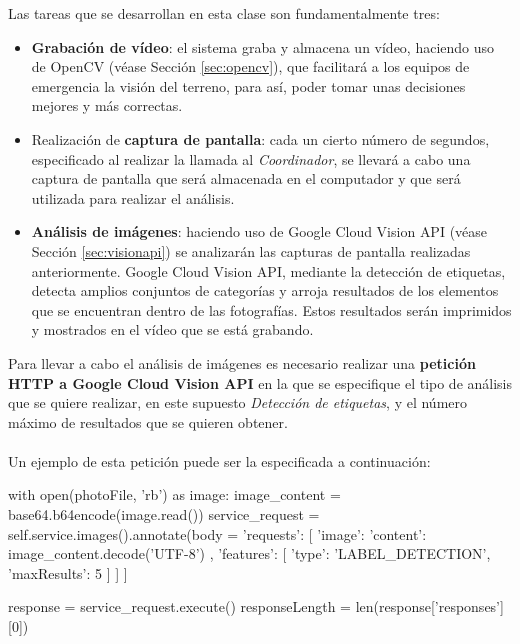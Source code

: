 Las tareas que se desarrollan en esta clase son fundamentalmente tres:
\begin{itemize}
\item \textbf{Grabación de vídeo}: el sistema graba y almacena un vídeo, haciendo uso de OpenCV (véase Sección \ref{sec:opencv}), que facilitará a los equipos de emergencia la visión del terreno, para así, poder tomar unas decisiones mejores y más correctas.
\item Realización de \textbf{captura de pantalla}: cada un cierto número de segundos, especificado al realizar la llamada al \textit{Coordinador}, se llevará a cabo una captura de pantalla que será almacenada en el computador y que será utilizada para realizar el análisis.
\item \textbf{Análisis de imágenes}: haciendo uso de Google Cloud Vision \acs{API} (véase Sección \ref{sec:visionapi}) se analizarán las capturas de pantalla realizadas anteriormente. Google Cloud Vision \acs{API}, mediante la detección de etiquetas, detecta amplios conjuntos de categorías y arroja resultados de los elementos que se encuentran dentro de las fotografías. Estos resultados serán imprimidos y mostrados en el vídeo que se está grabando. \\
\end{itemize}

Para llevar a cabo el análisis de imágenes es necesario realizar una \textbf{petición HTTP a Google Cloud Vision \acs{API}} en la que se especifique el tipo de análisis que se quiere realizar, en este supuesto \textit{Detección de etiquetas}, y el número máximo de resultados que se quieren obtener. \\ \\

Un ejemplo de esta petición puede ser la especificada a continuación:

\begin{listing}[
 float=h!,
 language = Python,
 caption = {Ejemplo de petición a Google Cloud Vision \acs{API} para la detección de etiquetas},
 label  = code:analisis]
with open(photoFile, 'rb') as image:
	image_content = base64.b64encode(image.read())
    service_request = self.service.images().annotate(body = {
    	'requests': [{
        	'image': {
          		'content': image_content.decode('UTF-8')
        			},
        		'features': [{
          			'type': 'LABEL_DETECTION',
          			'maxResults': 5
        		}]
      	}]
    }]
    
		
    response = service_request.execute()
	responseLength = len(response['responses'][0])
\end{listing}

